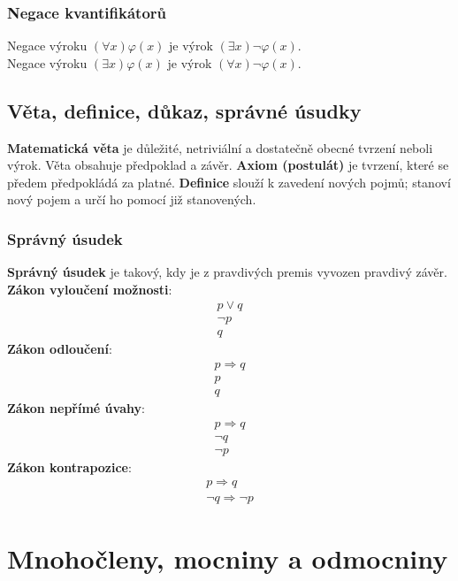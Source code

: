 \documentclass[12pt, a4paper]{article}
\begin{document}
\subsubsection*{Negace kvantifikátorů}
Negace výroku $(\forall x) \varphi (x) $ je výrok $(\exists x) \neg \varphi (x)$.\\
Negace výroku $(\exists x) \varphi (x) $ je výrok $ (\forall x) \neg \varphi (x)$.\\

\subsection*{Věta, definice, důkaz, správné úsudky}
\textbf{Matematická věta} je důležité, netriviální a dostatečně obecné tvrzení neboli výrok. Věta obsahuje předpoklad a závěr.
\textbf{Axiom (postulát)} je tvrzení, které se předem předpokládá za platné. 
\textbf{Definice} slouží k zavedení nových pojmů; stanoví nový pojem a určí ho pomocí již stanovených.
\subsubsection*{Správný úsudek}
\textbf{Správný úsudek} je takový, kdy je z pravdivých premis vyvozen pravdivý závěr.\\
\textbf{Zákon vyloučení možnosti}:
\begin{gather*}
 p \lor q \\ \neg p \\ \hline q
\end{gather*}
\textbf{Zákon odloučení}:
\begin{gather*}
p \Rightarrow q \\ p \\ \hline q
\end{gather*}
\textbf{Zákon nepřímé úvahy}:
\begin{gather*}
p \Rightarrow q \\ \neg q \\ \hline \neg p
\end{gather*}
\textbf{Zákon kontrapozice}:
\begin{gather*}
p \Rightarrow q \\ \hline \neg q \Rightarrow \neg p
\end{gather*}
\pagebreak
\section{Mnohočleny, mocniny a odmocniny}
\end{document}
